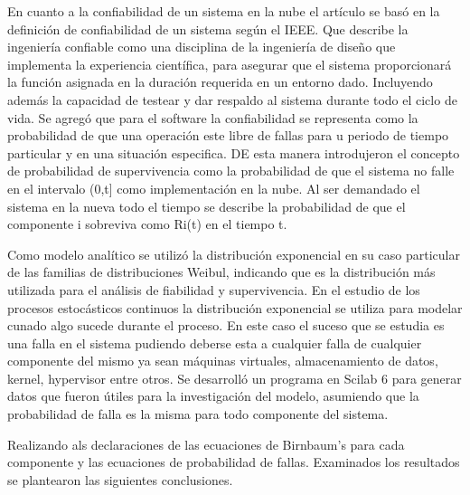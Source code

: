 En cuanto a la confiabilidad de un sistema en la nube el artículo se basó en la definición de confiabilidad de un sistema según el IEEE. Que describe la ingeniería confiable como una disciplina de la ingeniería de diseño que implementa la experiencia científica, para asegurar que el sistema proporcionará la función asignada en la duración requerida en un entorno dado. Incluyendo además la capacidad de testear y dar respaldo al sistema durante todo el ciclo de vida. Se agregó que para el software la confiabilidad se representa como la probabilidad de que una operación este libre de fallas para u periodo de tiempo particular y en una situación especifica.
DE esta manera introdujeron el concepto de probabilidad de supervivencia como la probabilidad de que el sistema no falle en el intervalo (0,t]  como implementación en la nube. Al ser demandado el sistema en la nueva todo el tiempo se describe la probabilidad de que el componente i sobreviva como Ri(t) en el tiempo t.


Como modelo analítico se utilizó la distribución exponencial en su caso particular de las familias de distribuciones Weibul, indicando que es la distribución más utilizada para el análisis de fiabilidad y supervivencia. En el estudio de los procesos estocásticos continuos la distribución exponencial se utiliza para modelar cunado algo sucede durante el proceso. En este caso el suceso que se estudia es una falla en el sistema pudiendo deberse esta a cualquier falla de cualquier componente del mismo ya sean máquinas virtuales, almacenamiento de datos, kernel, hypervisor entre otros.
Se desarrolló un programa en Scilab 6 para generar datos que fueron útiles para la investigación del modelo, asumiendo que la probabilidad de falla es la misma para todo componente del sistema.

Realizando als declaraciones de las ecuaciones de Birnbaum’s para cada componente y las ecuaciones de probabilidad de fallas. Examinados los resultados se plantearon las siguientes conclusiones. 

